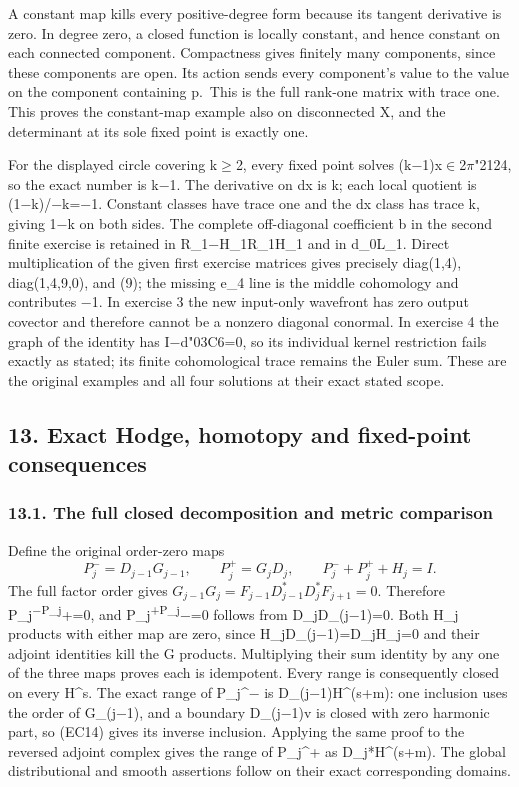 \documentclass[
  11pt,
]{article}
\begin{document}
A constant map kills every positive-degree form because its tangent
derivative is zero. In degree zero, a closed function is locally
constant, and hence constant on each connected component. Compactness
gives finitely many components, since these components are open. Its
action sends every component's value to the value on the component
containing p.~This is the full rank-one matrix with trace one. This
proves the constant-map example also on disconnected X, and the
determinant at its sole fixed point is exactly one.

For the displayed circle covering k\ensuremath{\geq}2, every fixed point solves
(k−1)x\ensuremath{\in}2\ensuremath{\pi}{\ReaderSymbols\char"2124}, so the exact number is k−1. The derivative on dx is k; each
local quotient is (1−k)/−k\textbar=−1. Constant classes have
trace one and the dx class has trace k, giving 1−k on both sides. The
complete off-diagonal coefficient b in the second finite exercise is
retained in R\_1−H\_1R\_1H\_1 and in d\_0L\_1. Direct multiplication of
the given first exercise matrices gives precisely diag(1,4),
diag(1,4,9,0), and (9); the missing e\_4 line is the middle cohomology
and contributes −1. In exercise 3 the new input-only wavefront has zero
output covector and therefore cannot be a nonzero diagonal conormal. In
exercise 4 the graph of the identity has I−d{\ReaderSymbols\char"03C6}=0, so its individual
kernel restriction fails exactly as stated; its finite cohomological
trace remains the Euler sum. These are the original examples and all
four solutions at their exact stated scope.

\subsection{13. Exact Hodge, homotopy and fixed-point
consequences}\label{exact-hodge-homotopy-and-fixed-point-consequences}

\subsubsection{13.1. The full closed decomposition and metric
comparison}\label{the-full-closed-decomposition-and-metric-comparison}

Define the original order-zero maps \[
P_j^- =D_{j-1}G_{j-1},\qquad P_j^+=G_jD_j,
\qquad P_j^-+P_j^++H_j=I.
\tag{LC12}
\] The full factor order gives
\(G_{j-1}G_j=F_{j-1}D_{j-1}^*D_j^*F_{j+1}=0\). Therefore
P\_j\textsuperscript{−P\_j}+=0, and P\_j\textsuperscript{+P\_j}−=0
follows from D\_jD\_(j−1)=0. Both H\_j products with either map are
zero, since H\_jD\_(j−1)=D\_jH\_j=0 and their adjoint identities kill
the G products. Multiplying their sum identity by any one of the three
maps proves each is idempotent. Every range is consequently closed on
every H\^{}s. The exact range of P\_j\^{}− is D\_(j−1)H\^{}(s+m): one
inclusion uses the order of G\_(j−1), and a boundary D\_(j−1)v is closed
with zero harmonic part, so (EC14) gives its inverse inclusion. Applying
the same proof to the reversed adjoint complex gives the range of
P\_j\^{}+ as D\_j*H\^{}(s+m). The global distributional and smooth
assertions follow on their exact corresponding domains.
\end{document}

